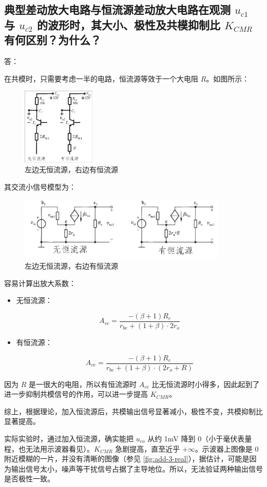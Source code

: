 \documentclass[a4paper,11pt,UTF8]{ctexart}
\newcommand{\p}{\par}
\newcommand{\np}{\par\noindent}
\begin{document}
	\subsection{典型差动放大电路与恒流源差动放大电路在观测 $u_{c1}$ 与 $u_{c2}$ 的波形时，其大小、极性及共模抑制比 $K_{CMR}$ 有何区别？为什么？}
	\np 答：
	\p 在共模时，只需要考虑一半的电路，恒流源等效于一个大电阻 $R$。如图所示：
	\begin{figure}[H]
		\centering
		\includegraphics[width=3.5cm]{CCircuit}
		\caption{左边无恒流源，右边有恒流源}
		\label{fig:add-3}
	\end{figure}
	\p 其交流小信号模型为：
	\begin{figure}[H]
		\centering
		\includegraphics[width=10cm]{CCircuitSmallSignal}
		\caption{左边无恒流源，右边有恒流源}
		\label{fig:add-3-ss}
	\end{figure}
	\p 容易计算出放大系数：
	\begin{itemize}
		\item 无恒流源：
		\np 
		\[ A_{vc}=\frac{-(\beta+1)R_c}{r_{be}+(1+\beta)\cdot 2r_o} \]
		\item 有恒流源：
		\np
		\[ A_{vc}=\frac{-(\beta+1)R_c}{r_{be}+(1+\beta)\cdot(2r_o+R)} \]
	\end{itemize}
	\p 因为 $R$ 是一很大的电阻，所以有恒流源时 $A_{vc}$ 比无恒流源时小得多，因此起到了进一步抑制共模信号的作用，可以进一步提高 $K_{CMR}$。
	\p 综上，根据理论，加入恒流源后，共模输出信号显著减小，极性不变，共模抑制比显著提高。
	\p 实际实验时，通过加入恒流源，确实能把 $u_{co}$ 从约 1mV 降到 0（小于毫伏表量程，也无法用示波器看见）。$K_{CMR}$ 急剧提高，直至近乎 $+\infty$。示波器上图像是 0 附近模糊的一片，并没有清晰的图像（参见 \ref{fig:add-3-real}），据估计，可能是因为输出信号太小，噪声等干扰信号占据了主导地位。所以，无法验证两种输出信号是否极性一致。
	
	
	
\end{document}
